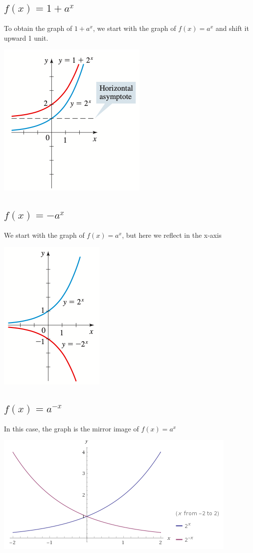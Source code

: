 \documentclass{book}
\begin{document}
	 \subsection{$f(x)=1+a^x$}
	 To obtain the graph of $1+a^x$, we start with the graph of $f(x) = a^x$ and shift it upward 1 unit.
	 
	 \includegraphics[scale=0.8]{exp1}
	 
	 \subsection{$f(x) = -a^x$}
	 We start with the graph of $f(x) = a^x$, but here we reflect in the x-axis
	 
	 \includegraphics[scale=0.8]{exp2}
	 
	 \subsection{$f(x) = a^{-x}$}
	 In this case, the graph is the mirror image of $f(x) = a^x$
	 
	 \includegraphics[scale=0.8]{exp3}
	 
\end{document}
